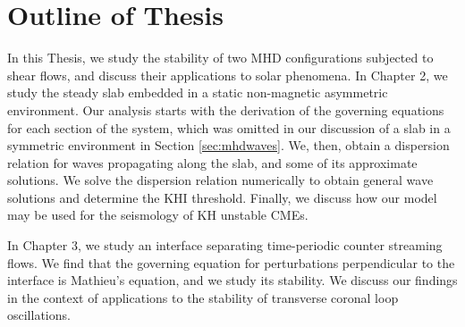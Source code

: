 \section{Outline of Thesis}

In this Thesis, we study the stability of two MHD configurations subjected to shear flows, and discuss their applications to solar phenomena.
In Chapter 2, we study the steady slab embedded in a static non-magnetic asymmetric environment.
Our analysis starts with the derivation of the governing equations for each section of the system, which was omitted in our discussion of a slab in a symmetric environment in Section \ref{sec:mhdwaves}.
We, then, obtain a dispersion relation for waves propagating along the slab, and some of its approximate solutions.
We solve the dispersion relation numerically to obtain general wave solutions and determine the KHI threshold.
Finally, we discuss how our model may be used for the seismology of KH unstable CMEs.

In Chapter 3, we study an interface separating time-periodic counter streaming flows.
We find that the governing equation for perturbations perpendicular to the interface is Mathieu's equation, and we study its stability.
We discuss our findings in the context of applications to the stability of transverse coronal loop oscillations.
